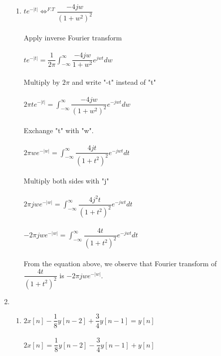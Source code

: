 \documentclass[10pt,a4paper, margin=1in]{article}
\begin{document}
\begin{enumerate}
\begin{enumerate}
    \item %
    $te^{-|t|} \Longleftrightarrow^{F.T} \dfrac{-4jw}{(1+w^{2})^{2}}$\\\\
    Apply inverse Fourier transform\\\\
    $te^{-|t|}= \dfrac{1}{2\pi}\int^{\infty}_{-\infty}\dfrac{-4jw}{1+w^{2}}e^{jwt}dw$\\\\
    Multiply by $2\pi$ and write "-t" instead of "t"\\\\
    $2\pi te^{-|t|}= \int^{\infty}_{-\infty}\dfrac{-4jw}{(1+w^{2})^2}e^{-jwt}dw$\\\\
    Exchange "t" with "w".\\\\
    $2\pi w e^{-|w|} = \int^{\infty}_{-\infty}\dfrac{4jt}{(1+t^2)^{2}}e^{-jwt}dt$\\\\
    Multiply both sides with "j"\\\\
    $2\pi jwe^{-|w|}= \int^{\infty}_{-\infty}\dfrac{4j^{2}t}{(1+t^{2})^{2}}e^{-jwt}dt$\\\\
    $-2\pi jwe^{-|w|} = \int^{\infty}_{-\infty}\dfrac{4t}{(1+t^{2})^{2}}e^{-jwt}dt$\\\\
    From the equation above, we observe that Fourier transform of $\dfrac{4t}{(1+t^{2})^{2}}$ is $-2\pi jwe^{-|w|}$.

    \end{enumerate}

\item %
    \begin{enumerate}
    \item %
    $2x[n] - \dfrac{1}{8} y[n-2] + \dfrac{3}{4} y[n-1] = y[n]$ \\ \\
    $2x[n] = \dfrac{1}{8} y[n-2] - \dfrac{3}{4} y[n-1] + y[n]$ \\ \\


\end{enumerate}
\end{enumerate}
\end{document}
